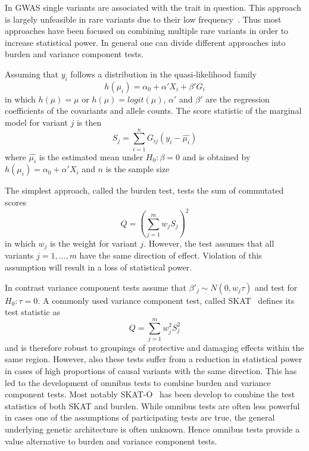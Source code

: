 In GWAS single variants are associated with the trait in question.
This approach is largely unfeasible in rare variants due to their low frequency~\cite{Lee2014}.
Thus most approaches have been focused on combining multiple rare variants in order to increase statistical power.
In general one can divide different approaches into burden and variance component tests.

Assuming that $y_i$ follows a distribution in the quasi-likelihood family~\cite{Lee2014}
\begin{equation}
  h(\mu_i) = \alpha_0 + \alpha'X_i +\beta'G_i
\end{equation}
in which $h(\mu) = \mu$ or $h(\mu) = logit(\mu)$, $\alpha'$ and $\beta'$ are the regression coefficients of the covariants and allele counts.
The score statistic of the marginal model for variant $j$ is then
\begin{equation}
  S_j = \sum^n_{i=1} G_{ij}(y_i-\hat{\mu_i})
\end{equation}
where $\hat{\mu_i}$ is the estimated mean under $H_0: \beta = 0 $ and is obtained by $h(\mu_i) = \alpha_0 + \alpha'X_i$ and $n$ is the sample size

The simplest approach, called the burden test, tests the sum of commutated scores
\begin{equation}\label{eq:burden}
  Q = {(\sum^{m}_{j=1} w_{j} S_{j})}^2
\end{equation}
in which $w_j$ is the weight for variant $j$.
However, the test assumes that all variants $j = 1,\ldots,m$ have the same direction of effect.
Violation of this assumption will result in a loss of statistical power.

In contrast variance component tests assume that $\beta'_j\sim N(0,w_j\tau)$ and test for $H_0: \tau = 0$.
A commonly used variance component test, called SKAT~\cite{Wu2011} defines its test statistic as
\begin{equation}\label{eq:skat}
  Q = \sum^{m}_{j=1} w_{j}^2 S_{j}^2
\end{equation}
and is therefore robust to groupings of protective and damaging effects within the same region.
However, also these tests suffer from a reduction in statistical power in cases of high proportions of causal variants with the same direction.
This has led to the development of omnibus tests to combine burden and variance component tests.
Most notably SKAT-O~\cite{Lee2012} has been develop to combine the test statistics of both SKAT and burden.
While omnibus tests are often less powerful in cases one of the assumptions of participating tests are true, the general underlying genetic architecture is often unknown.
Hence omnibus tests provide a value alternative to burden and variance component tests.
